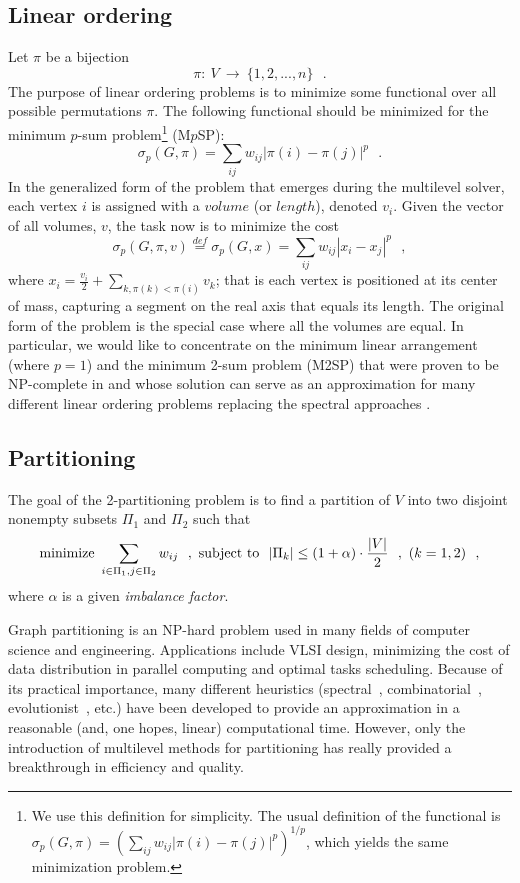 \documentclass[final]{siamltex}
\newcommand{\mtp}{minimum $p$-sum problem}
\begin{document}
\subsection{Linear ordering}
Let $\pi$ be a bijection
\[
\pi : ~ V ~ \longrightarrow ~ \{1,2,...,n\}~~~.
\]
The purpose of linear ordering problems is to minimize some functional over all possible permutations $\pi$. The following functional should be minimized for the {\mtp}\footnote{We use this definition for simplicity. The usual definition of the functional is $\sigma_p(G,\pi)=(\sum_{ij}w_{ij}|\pi(i)-\pi(j)|^p)^{1/p}$, which yields the same minimization problem.} (M$p$SP):
\begin{equation}\label{minpsumdef}
\sigma_p(G,\pi)=\sum_{ij}w_{ij}|\pi(i)-\pi(j)|^p~~~.
\end{equation}
 In the generalized form of the problem that emerges during the multilevel solver, each vertex $i$ is assigned with a $volume$ (or $length$), denoted $v_i$. Given the vector of all volumes, $v$, the task now is to minimize the cost
 \[
 \sigma_p(G, \pi, v)\overset{def}{=} \sigma_p(G,x)=\sum_{ij}w_{ij}|x_i-x_j|^p~~~,
 \]
where \mbox{$x_i=\frac{v_i}{2}+\sum_{k, \pi(k)<\pi(i)}v_k$}; that is each vertex is positioned at its center of mass, capturing a segment on the real axis that equals its length. The original form of the problem is the special case where all the volumes are equal. In particular, we would like to concentrate on the minimum linear arrangement (where $p=1$) and the minimum 2-sum problem (M2SP) that were proven to be NP-complete in \cite{gjs,georgepothen} and whose solution can serve as an approximation for many different linear ordering problems replacing the spectral approaches \cite{safro2004,safro2005}.
\subsection{Partitioning}
\par The goal of the 2-partitioning problem is to find a partition of $V$ into two disjoint nonempty subsets $\Pi_1$ and $\Pi_2$ such that
\begin{equation}
\label{part-def}
    \text{minimize }  \sum_{i\in \Pi_1 , j\in \Pi_2}w_{ij}~~,~~\\
    \text{subject to} ~~ |\Pi_k|\leq (1+\alpha)\cdot \frac{|V|}{2}~~,
     ~(k=1,2) ~~,
\end{equation}
where $\alpha$ is a given {\it imbalance factor}.
\par Graph partitioning is an NP-hard problem \cite{Garey79} used in many fields of
computer science and engineering. Applications include VLSI
design, minimizing the cost of data distribution in parallel
computing and optimal tasks scheduling. Because of its practical
importance, many different heuristics (spectral~\cite{posili90}, combinatorial~\cite{keli70,fima82},
evolutionist~\cite{buiMoon96}, etc.) have been developed to
provide an approximation in a reasonable (and, one hopes, linear)
computational time. However, only the introduction of multilevel
methods for partitioning
\cite{metis,webscotch,alpert97multilevel,MeyerhenkeMonienSauerwald08new,Walshaw-AoOR-04,evo03proc,doritpart,barnard94fast,hendrickson95multilevel,kaku95a,Abou-RjeiliK06}
has really provided a breakthrough in efficiency and quality.
\end{document}
